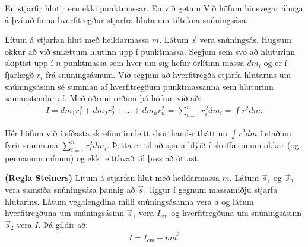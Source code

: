 \newpage

En stjarfir hlutir eru ekki punktmassar. En við getum 
Við höfum hinsvegar áhuga á því að finna hverfitregður stjarfra hluta um tiltekna snúningsása.

\begin{tcolorbox}
\begin{definition}
Lítum á stjarfan hlut með heildarmassa $m$. Látum $\vec{s}$ vera snúningsás. Hugsum okkur að við smættum hlutinn upp í punktmassa. Segjum sem svo að hluturinn skiptist upp í $n$ punktmassa sem hver um sig hefur örlítinn massa $dm_i$ og er í fjarlægð $r_i$ frá snúningsásnum. Við segjum að hverfitregða stjarfa hlutarins um snúningsásinn sé summan af hverfitregðum punktmassanna sem hluturinn samanstendur af. Með öðrum orðum þá höfum við að:
\begin{align*}
    I = dm_1r_1^2 + dm_2r_2^2 + \ldots + dm_n r_n^2 = \sum_{i=1}^{n} r_i^2 dm_i = \int r^2dm.
\end{align*}
\end{definition}
\end{tcolorbox}

Hér höfum við í síðasta skrefinu innleitt shorthand-ritháttinn $\int r^2dm$ í staðinn fyrir summuna $\sum\limits_{i=1}^{n}r_i^2dm_i$. Þetta er til að spara blýið í skriffærunum okkar (og pennanum mínum) og ekki eitthvað til þess að óttast.


\begin{tcolorbox}
\begin{theorem}
\textbf{(Regla Steiners)} Lítum á stjarfan hlut með heildarmassa $m$. Látum $\vec{s}_1$ og $\vec{s}_2$ vera samsíða snúningsása þannig að $\vec{s}_1$ liggur í gegnum massamiðju stjarfa hlutarins. Látum vegalengdina milli snúningsásanna vera $d$ og látum hverfitregðuna um snúningsásinn $\vec{s}_1$ vera $I_{\text{cm}}$ og hverfitregðuna um snúningsásinn $\vec{s}_2$ vera $I$. Þá gildir að:
\begin{align*}
    I = I_{\text{cm}} + md^2
\end{align*}
\end{theorem}
\end{tcolorbox}

